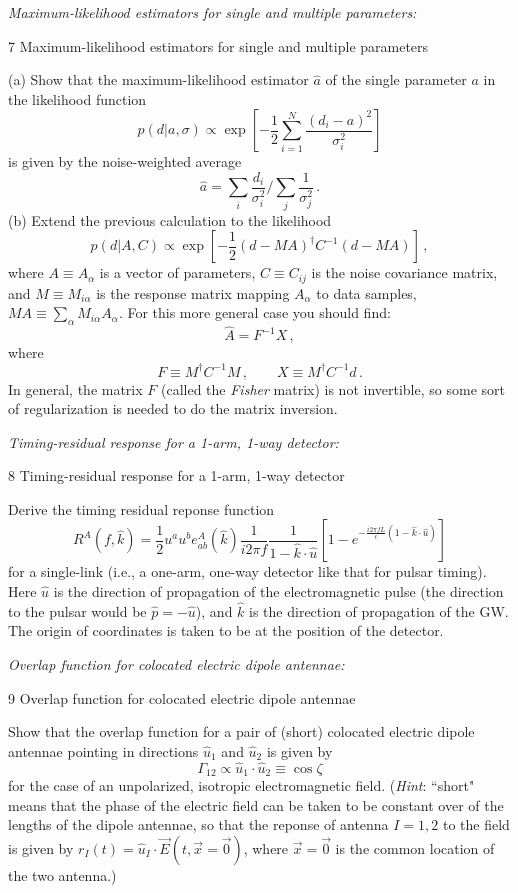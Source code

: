 \documentclass[11pt]{article}
\def\be{\begin{equation}}
\def\ee{\end{equation}}
\def\i{\item{}}
\begin{document}
\i {\em Maximum-likelihood estimators for single and multiple
parameters:}
{7 Maximum-likelihood estimators for single and multiple
parameters}

(a) Show that the maximum-likelihood estimator $\hat a$ of 
the single parameter $a$ in the likelihood function
\be
p(d|a, \sigma) \propto
\exp\left[-\frac{1}{2}\sum_{i=1}^N \frac{(d_i-a)^2}{\sigma_i^2}\right]
\ee
%
is given by the noise-weighted average
%
\be
\hat a={\sum_i \frac{d_i}{\sigma_i^2}}\bigg/{\sum_j \frac{1}{\sigma_j^2}}\,.
\ee
%
(b) Extend the previous calculation to the likelihood
\be
p(d|A, C) \propto
\exp\left[-\frac{1}{2}(d-MA)^\dagger C^{-1} (d-MA)\right]\,,
\ee
%
where $A\equiv A_\alpha$ is a vector of parameters,
$C\equiv C_{ij}$ is the noise covariance matrix, and 
$M\equiv M_{i\alpha}$ is the response matrix mapping 
$A_\alpha$ to data samples, $MA\equiv \sum_\alpha M_{i\alpha}A_\alpha$.
For this more general case you should find:
%
\be
\hat A = F^{-1} X\,,
\ee
%
where
%
\be
F \equiv M^\dagger C^{-1} M\,,\qquad
X \equiv M^\dagger C^{-1} d\,.
\ee
%
In general, the matrix $F$ (called the {\em Fisher} matrix)
is not invertible, so some sort of regularization is needed
to do the matrix inversion.

\i {\em Timing-residual response for a 1-arm, 1-way detector:}
{8 Timing-residual response for a 1-arm, 1-way detector}

Derive the timing residual reponse function
%
\be
R^A(f,\hat k) = 
\frac{1}{2}u^a u^b e^A_{ab}(\hat k)
\frac{1}{i2\pi f}
\frac{1}{1-\hat k\cdot \hat u}
\left[1-e^{-\frac{i2\pi fL}{c}(1-\hat k\cdot\hat u)}\right]
\ee
%
for a single-link (i.e., a one-arm, one-way detector like 
that for pulsar timing).
Here $\hat u$ is the direction of propagation of the
electromagnetic pulse (the direction to the pulsar
would be $\hat p=-\hat u$), and $\hat k$ is the direction 
of propagation of the GW.
The origin of coordinates is taken to be at the position 
of the detector.

\i {\em Overlap function for colocated electric dipole antennae:}
{9 Overlap function for colocated electric dipole antennae}

Show that the overlap function for a pair of (short)
colocated electric dipole antennae pointing in directions 
$\hat u_1$ and $\hat u_2$ is given by 
%
\be
\Gamma_{12} 
\propto
\hat u_1\cdot\hat u_2 
\equiv\cos\zeta
\ee
% 
for the case of an unpolarized, isotropic electromagnetic field.
({\em Hint}: ``short" means that the phase of the electric 
field can be taken to be constant over of the lengths of 
the dipole antennae, 
so that the reponse of antenna $I=1,2$ to the field is
given by $r_I(t)=\hat u_I\cdot\vec E(t, \vec x=\vec 0)$, where
$\vec x=\vec 0$ is the common location of the two antenna.)
 
\end{document}
